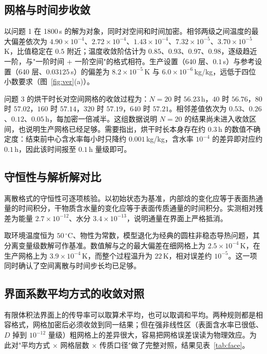 \documentclass[12pt,a4paper]{ctexart}
\begin{document}
\subsection{网格与时间步收敛}

以问题 1 在 1800\,s 的解为对象，同时对空间和时间加密。相邻两级之间温度的最大偏差依次为 $4.90\times10^{-4}$、$2.72\times10^{-4}$、$1.43\times10^{-4}$、$7.32\times10^{-5}$、$3.70\times10^{-5}$\,K，比值稳定在 $0.5$ 附近；温度收敛阶估计为 $0.85$、$0.93$、$0.97$、$0.98$，逐级趋近一阶，与"一阶时间 $+$ 一阶空间"的格式相符。生产设置（640 层、$0.1$\,s）与参考设置（640 层、$0.03125$\,s）的偏差为 $8.2\times10^{-5}$\,K 与 $6.0\times10^{-6}$\,kg/kg，远低于四位小数要求（图~\ref{fig:ver}(a)）。

问题 3 的烘干时长对空间网格的收敛过程为：$N=20$ 时 $56.23$\,h，$40$ 时 $56.76$，$80$ 时 $57.02$，$160$ 时 $57.14$，$320$ 时 $57.19$，$640$ 时 $57.21$。相邻差值依次为 $0.53$、$0.26$、$0.12$、$0.05$\,h，每加密一倍减半。这组数据说明 $N=20$ 的结果尚未进入收敛区间，也说明生产网格已经足够。需要指出，烘干时长本身存在约 $0.3$\,h 的数值不确定度：结束前中心含水率每小时只降约 $0.001$\,kg/kg，含水率 $10^{-4}$ 的差异即对应约 $0.1$\,h，因此该时间报至 $0.1$\,h 量级即可。

\subsection{守恒性与解析解对比}

离散格式的守恒性可逐项核验。以初始状态为基准，内部焓的变化应等于表面热通量的时间积分，干物质含水量的变化应等于表面传质通量的时间积分。实测相对残差为能量 $2.7\times10^{-12}$、水分 $3.4\times10^{-13}$，说明通量在界面上严格抵消。

取环境温度恒为 $50\,^\circ$C、物性为常数，模型退化为经典的圆柱非稳态导热问题，其分离变量级数解可作基准。数值解与之的最大偏差在细网格上为 $2.5\times10^{-4}$\,K，在生产网格上为 $3.9\times10^{-4}$\,K，而整个过程温升为 $22$\,K，相对误差约 $10^{-5}$。这一项同时确认了空间离散与时间步长均已足够。

\subsection{界面系数平均方式的收敛对照}
\label{sec:face}

有限体积法界面上的传导率可以取算术平均，也可以取调和平均。两种规则都是相容格式，网格加密后必须收敛到同一结果；但在强非线性区（表面含水率已很低、$D$ 掉到 $10^{-12}$ 量级）粗网格上的差异很大，容易把网格误差误读为物理效应。为此对"平均方式 $\times$ 网格层数 $\times$ 传质口径"做了完整对照，结果见表~\ref{tab:face}。
\end{document}
